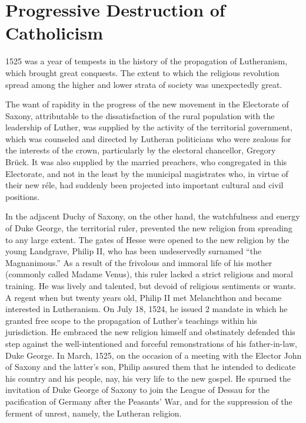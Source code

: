 \section{Progressive Destruction of Catholicism}

1525 was a year of tempests in the history of the propagation of
Lutheranism, which brought great conquests. The extent to which the
religious revolution spread among the higher and lower strata of
society was unexpectedly great.

The want of rapidity in the progress of the new movement in the
Electorate of Saxony, attributable to the dissatisfaction of the rural
population with the leadership of Luther, was supplied by the activity
of the territorial government, which was counseled and directed
by Lutheran politicians who were zealous for the interests of the
crown, particularly by the electoral chancellor, Gregory Brück. It
was also supplied by the married preachers, who congregated in this
Electorate, and not in the least by the municipal magistrates who,
in virtue of their new réle, had suddenly been projected into important
cultural and civil positions.

In the adjacent Duchy of Saxony, on the other hand, the watchfulness and
energy of Duke George, the territorial ruler, prevented the
new religion from spreading to any large extent.
The gates of Hesse were opened to the new religion by the young
Landgrave, Philip II, who has been undeservedly surnamed ``the
Magnanimous.'' As a result of the frivolous and immoral life of
his mother (commonly called Madame Venus), this ruler lacked
a strict religious and moral training. He was lively and talented,
but devoid of religious sentiments or wants. A regent when but
twenty years old, Philip II met Melanchthon and became interested
in Lutheranism. On July 18, 1524, he issued 2 mandate in which he
granted free scope to the propagation of Luther’s teachings within his
jurisdiction. He embraced the new religion himself and obstinately
defended this step against the well-intentioned and forceful remonstrations
of his father-in-law, Duke George. In March, 1525, on the
occasion of a meeting with the Elector John of Saxony and the latter’s
son, Philip assured them that he intended to dedicate his country and
his people, nay, his very life to the new gospel. He spurned the invitation
of Duke George of Saxony to join the League of Dessau for the
pacification of Germany after the Peasants’ War, and for the suppression
of the ferment of unrest, namely, the Lutheran religion.

